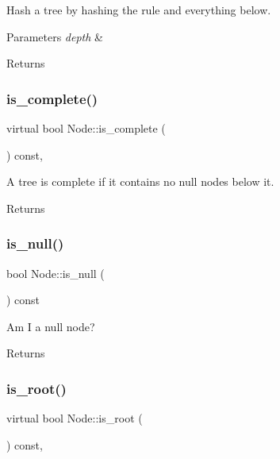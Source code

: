 Hash a tree by hashing the rule and everything below. 
\begin{DoxyParams}{Parameters}
{\em depth} & \\
\hline
\end{DoxyParams}
\begin{DoxyReturn}{Returns}

\end{DoxyReturn}
\mbox{\label{class_node_ac2e36754ba8b1b1d452deeb2bdbd346f}} 
\subsubsection{\texorpdfstring{is\+\_\+complete()}{is\_complete()}}
{\footnotesize\ttfamily virtual bool Node\+::is\+\_\+complete (\begin{DoxyParamCaption}{ }\end{DoxyParamCaption}) const\hspace{0.3cm}{\ttfamily [inline]}, {\ttfamily [virtual]}}

A tree is complete if it contains no null nodes below it. \begin{DoxyReturn}{Returns}

\end{DoxyReturn}
\mbox{\label{class_node_a895ef3b66f975fbaec1e5866a57afbed}} 
\subsubsection{\texorpdfstring{is\+\_\+null()}{is\_null()}}
{\footnotesize\ttfamily bool Node\+::is\+\_\+null (\begin{DoxyParamCaption}{ }\end{DoxyParamCaption}) const\hspace{0.3cm}{\ttfamily [inline]}}

Am I a null node? \begin{DoxyReturn}{Returns}

\end{DoxyReturn}
\mbox{\label{class_node_ad12a96da2fe796616aa22e20429f41d5}} 
\subsubsection{\texorpdfstring{is\+\_\+root()}{is\_root()}}
{\footnotesize\ttfamily virtual bool Node\+::is\+\_\+root (\begin{DoxyParamCaption}{ }\end{DoxyParamCaption}) const\hspace{0.3cm}{\ttfamily [inline]}, {\ttfamily [virtual]}}

